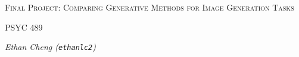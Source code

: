 \documentclass[12pt,a4paper]{report}
\theoremstyle{definition}
\begin{document}
\begin{titlepage}
    \vspace*{\fill}
    \centering
    {\scshape\LARGE Final Project: Comparing Generative Methods for Image
    Generation Tasks\par}
    \vspace{1cm}
    {\scshape\Large PSYC 489\par}
    \vspace{1.5cm}
    {\Large\itshape Ethan Cheng (\texttt{ethanlc2})\par}
    \vspace*{\fill}
\end{titlepage}

\newpage

\section*{}
\end{document}
